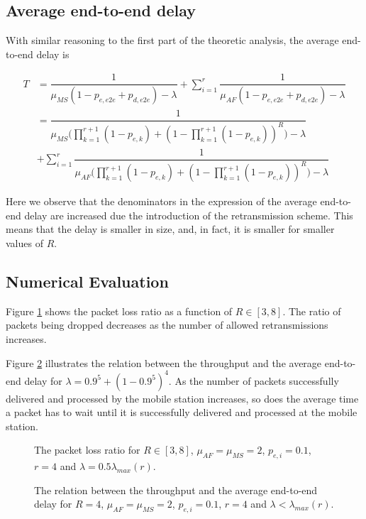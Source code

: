 \subsection{Average end-to-end delay}

With similar reasoning to the first part of the theoretic analysis, the average
end-to-end delay is

\begin{align*}
  T &= \dfrac{1}{\mu_{MS}(1 - p_{e,e2e} + p_{d,e2e}) - \lambda} +
    \sum\limits_{i=1}^r \dfrac{1}{\mu_{AF}(1 - p_{e,e2e} + p_{d,e2e}) - \lambda} \\
    &= \dfrac{1}{\mu_{MS}\Big(\prod\limits_{k=1}^{r+1}(1-p_{e,k}) + (1 - \prod\limits_{k=1}^{r+1}(1-p_{e,k}))^R \Big) - \lambda} \\
    &+ \sum\limits_{i=1}^r \dfrac{1}{\mu_{AF}\Big(\prod\limits_{k=1}^{r+1}(1-p_{e,k}) + (1 - \prod\limits_{k=1}^{r+1}(1-p_{e,k}))^R \Big) - \lambda}
\end{align*}


Here we observe that the denominators in the expression of the average end-to-end
delay are increased due the introduction of the retransmission scheme. This
means that the delay is smaller in size, and, in fact, it is smaller for smaller
values of $R$.

\subsection{Numerical Evaluation}

Figure \ref{fig:07_packet_loss_ratio} shows the packet loss ratio as a function
of $R \in [3,8]$. The ratio of packets being dropped decreases as the number of
allowed retransmissions increases.

Figure \ref{fig:07_throughput_delay.tex} illustrates the relation between the
throughput and the average end-to-end delay for $\lambda = 0.9^5 + (1-0.9^5)^4$.
As the number of packets successfully delivered and processed by the mobile
station increases, so does the average time a packet has to wait until it is
successfully delivered and processed at the mobile station.

\begin{figure}[H]\centering
  
  \caption{The packet loss ratio for $R \in [3,8]$, $\mu_{AF} = \mu_{MS} = 2$,
    $p_{e,i} = 0.1$, $r=4$ and $\lambda = 0.5 \lambda_{max}(r)$.}
  \label{fig:07_packet_loss_ratio}
\end{figure}

\begin{figure}\centering
  
  \caption{The relation between the throughput and the average end-to-end delay
    for $R=4$, $\mu_{AF} = \mu_{MS} = 2$, $p_{e,i} = 0.1$, $r=4$ and
    $\lambda < \lambda_{max}(r)$.}
  \label{fig:07_throughput_delay.tex}
\end{figure}
